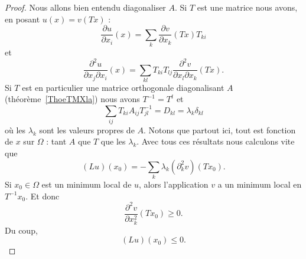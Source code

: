 \begin{proof}
    Nous allons bien entendu diagonaliser \( A\). Si \( T\) est une matrice nous avons, en posant \( u(x)=v(Tx)\) :
    \begin{equation}
        \frac{ \partial u }{ \partial x_i }(x)=\sum_k\frac{ \partial v }{ \partial x_k }(Tx)T_{ki}
    \end{equation}
    et
    \begin{equation}
        \frac{ \partial^2u }{ \partial x_j\partial x_i }(x)=\sum_{kl}T_{ki}T_{lj}\frac{ \partial^2v }{ \partial x_l\partial x_k }(Tx).
    \end{equation}
    Si \( T\) est en particulier une matrice orthogonale diagonalisant \( A\) (théorème~\ref{ThoeTMXla}) nous avons \( T^{-1}=T^t\) et
    \begin{equation}
        \sum_{ij}T_{ki}A_{ij}T^{-1}_{jl}=D_{kl}=\lambda_k\delta_{kl}
    \end{equation}
    où les \( \lambda_k\) sont les valeurs propres de \( A\). Notons que partout ici, tout est fonction de \( x\) sur \( \Omega\) : tant \( A\) que \( T\) que les \( \lambda_k\). Avec tous ces résultats nous calculons vite que
    \begin{equation}
        (Lu)(x_0)=-\sum_k\lambda_k(\partial^2_kv)(Tx_0).
    \end{equation}
    Si \( x_0\in \Omega\) est un minimum local de \( u\), alors l'application \( v\) a un minimum local en \( T^{-1} x_0\). Et donc
    \begin{equation}
        \frac{ \partial^2v }{ \partial x_k^2 }(Tx_0)\geq 0.
    \end{equation}
    Du coup,
    \begin{equation}
        (Lu)(x_0)\leq 0.
    \end{equation}
\end{proof}


